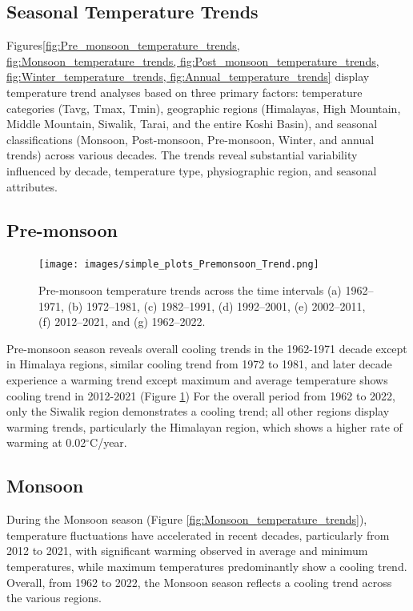
\subsection{Seasonal Temperature Trends}

Figures\ref{fig:Pre_monsoon_temperature_trends, fig:Monsoon_temperature_trends, fig:Post_monsoon_temperature_trends, fig:Winter_temperature_trends, fig:Annual_temperature_trends}  display temperature trend analyses based on three primary factors: temperature categories (Tavg, Tmax, Tmin), geographic regions (Himalayas, High Mountain, Middle Mountain, Siwalik, Tarai, and the entire Koshi Basin), and seasonal classifications (Monsoon, Post-monsoon, Pre-monsoon, Winter, and annual trends) across various decades. The trends reveal substantial variability influenced by decade, temperature type, physiographic region, and seasonal attributes.

\subsection*{Pre-monsoon}

\begin{figure}[H] 
  \centering
  \texttt{[image: images/simple\_plots\_Premonsoon\_Trend.png]}  
  \caption{Pre-monsoon temperature trends across the time intervals (a) 1962–1971, (b) 1972–1981, (c) 1982–1991, (d) 1992–2001, (e) 2002–2011, (f) 2012–2021, and (g) 1962–2022.} 
  \label{fig:Pre_monsoon_temperature_trends}  
\end{figure}

Pre-monsoon season reveals overall cooling trends in the 1962-1971 decade except in Himalaya regions, similar cooling trend from 1972 to 1981, and later decade experience a warming trend except maximum and average temperature shows cooling trend in 2012-2021 (Figure \ref{fig:Pre_monsoon_temperature_trends}) For the overall period from 1962 to 2022, only the Siwalik region demonstrates a cooling trend; all other regions display warming trends, particularly the Himalayan region, which shows a higher rate of warming at 0.02$^\circ$C/year.  

\subsection*{Monsoon}
During the Monsoon season (Figure \ref{fig:Monsoon_temperature_trends}), temperature fluctuations have accelerated in recent decades, particularly from 2012 to 2021, with significant warming observed in average and minimum temperatures, while maximum temperatures predominantly show a cooling trend. Overall, from 1962 to 2022, the Monsoon season reflects a cooling trend across the various regions.

